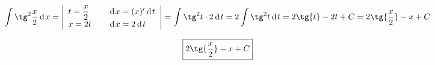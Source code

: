 {}

$$
  \int \tg^2{\dfrac{x}{2}}\d{x} = \Bigg |
    \begin{array}{l c  l}
      t = \dfrac{x}{2} & & \d{x} = (x)'\d{t}  \\
      x = 2t & & \d{x} = 2\d{t}
    \end{array}
  \Bigg |
  = \int \tg^2{t} \cdot 2\d{t}
  = 2 \int \tg^2{t}\d{t}
  = 2\tg{t}-2t+C
  = 2\tg{\dfrac{x}{2}} - x + C
$$

$$
  \boxed{2\tg{\dfrac{x}{2}} - x + C}
$$
